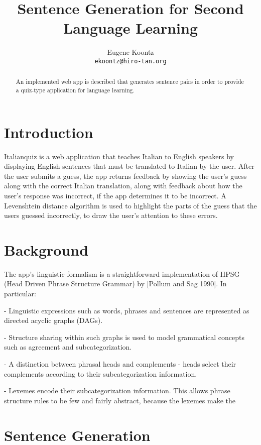 \documentclass[11pt]{article}
\title{Sentence Generation for Second Language Learning}
\author{Eugene Koontz\\
  {\tt ekoontz@hiro-tan.org} }
\date{}
\begin{document}
\maketitle
\begin{abstract}
  An implemented web app is described that generates sentence pairs in
  order to provide a quiz-type application for language learning.
\end{abstract}

\section{Introduction}

Italianquiz is a web application that teaches Italian to English
speakers by displaying English sentences that must be translated to
Italian by the user. After the user submits a guess, the app returns
feedback by showing the user's guess along with the correct Italian
translation, along with feedback about how the user's response was
incorrect, if the app determines it to be incorrect. A Levenshtein distance
algorithm is used to highlight the parts of the guess that the users
guessed incorrectly, to draw the user's attention to these errors.



\section{Background}

The app's linguistic formalism is a straightforward implementation of
HPSG (Head Driven Phrase Structure Grammar) by [Pollum and Sag 1990]. In
particular:

- Linguistic expressions such as words, phrases and sentences are
represented as directed acyclic graphs (DAGs).

- Structure sharing within such graphs is used to model grammatical
concepts such as agreement and subcategorization.

- A distinction between phrasal heads and complements - heads select
their complements according to their subcategorization information.

- Lexemes encode their subcategorization information. This allows
phrase structure rules to be few and fairly abstract, because the
lexemes make the 

\section{Sentence Generation}
\end{document}
